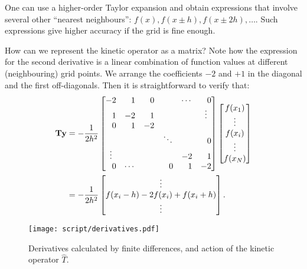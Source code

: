 \documentclass{article}
\begin{document}
One can use a higher-order Taylor expansion and obtain expressions that
involve several other ``nearest neighbours'': $f(x), f(x \pm h), f(x \pm
2h), \ldots$.  Such expressions give higher accuracy if the grid is fine
enough.


How can we represent the kinetic operator as a matrix?
Note how the expression for the second derivative is a linear combination
of function values at different (neighbouring) grid points.
We arrange the coefficients $-2$ and $+1$ in the diagonal and the first off-diagonals.
Then it is straightforward to verify that:
\begin{align}
  \mathbf T \mathbf y &=
  -\frac{1}{2h^2} \left[
    \begin{matrix}
      -2 & \hphantom +1  & \hphantom + 0 & &\cdots& \hphantom + 0\\
      \hphantom +1  & -2 & \hphantom +1 &       && \vdots\\
      \hphantom + 0 & \hphantom +1 & -2 &  &&  \\
       & & & \ddots&   & \hphantom + 0\\
      \vdots & & & &  -2& \hphantom +1\\
      \hphantom + 0 & \cdots && \hphantom + 0 & \hphantom +1 & -2
    \end{matrix}
    \right]
  \left[
    \begin{matrix}
    f(x_1)\\
    \vdots\\
    f(x_i)\\
    \vdots\\
    f(x_N)\\
    \end{matrix}
    \right]
  \nonumber\\
  &= -\frac{1}{2h^2} \left[
    \begin{matrix}
    \vdots\\
    f(x_i - h) - 2 f(x_i) + f(x_i + h)\\
    \vdots
    \end{matrix}
    \right].
\end{align}

\begin{figure}
  \texttt{[image: script/derivatives.pdf]}
  \caption{Derivatives calculated by finite differences, and action of
    the kinetic operator $\hat T$.}\label{fig:deriv}
\end{figure}
\end{document}
